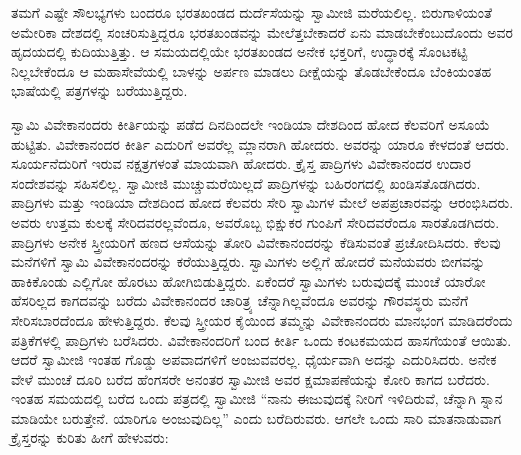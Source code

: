  ತಮಗೆ ಎಷ್ಟೇ ಸೌಲಭ್ಯಗಳು ಬಂದರೂ ಭರತಖಂಡದ ದುರ್ದೆಸೆಯನ್ನು ಸ್ವಾಮೀಜಿ ಮರೆಯಲಿಲ್ಲ. ಬಿರುಗಾಳಿಯಂತೆ ಅಮೇರಿಕಾ ದೇಶದಲ್ಲಿ ಸಂಚರಿಸುತ್ತಿದ್ದರೂ ಭರತಖಂಡವನ್ನು ಮೇಲೆತ್ತಬೇಕಾದರೆ ಏನು ಮಾಡಬೇಕೆಂಬುದೊಂದು ಅವರ ಹೃದಯದಲ್ಲಿ ಕುದಿಯುತ್ತಿತ್ತು. ಆ ಸಮಯದಲ್ಲಿಯೇ ಭರತಖಂಡದ ಅನೇಕ ಭಕ್ತರಿಗೆ, ಉದ್ಧಾರಕ್ಕೆ ಸೊಂಟಕಟ್ಟಿ ನಿಲ್ಲಬೇಕೆಂದೂ ಆ ಮಹಾಸೇವೆಯಲ್ಲಿ ಬಾಳನ್ನು ಅರ್ಪಣ ಮಾಡಲು ದೀಕ್ಷೆಯನ್ನು ತೊಡಬೇಕೆಂದೂ ಬೆಂಕಿಯಂತಹ ಭಾಷೆಯಲ್ಲಿ ಪತ್ರಗಳನ್ನು ಬರೆಯುತ್ತಿದ್ದರು. 

 ಸ್ವಾಮಿ ವಿವೇಕಾನಂದರು ಕೀರ್ತಿಯನ್ನು ಪಡೆದ ದಿನದಿಂದಲೇ ಇಂಡಿಯಾ ದೇಶದಿಂದ ಹೋದ ಕೆಲವರಿಗೆ ಅಸೂಯೆ ಹುಟ್ಟಿತು. ವಿವೇಕಾನಂದರ ಕೀರ್ತಿ ಎದುರಿಗೆ ಅವರೆಲ್ಲ ಮ್ಲಾನರಾಗಿ ಹೋದರು. ಅವರನ್ನು ಯಾರೂ ಕೇಳದಂತೆ ಆದರು. ಸೂರ್ಯನೆದುರಿಗೆ ಇರುವ ನಕ್ಷತ್ರಗಳಂತೆ ಮಾಯವಾಗಿ ಹೋದರು. ಕ್ರೈಸ್ತ ಪಾದ್ರಿಗಳು ವಿವೇಕಾನಂದರ ಉದಾರ ಸಂದೇಶವನ್ನು ಸಹಿಸಲಿಲ್ಲ. ಸ್ವಾಮೀಜಿ ಮುಚ್ಚುಮರೆಯಿಲ್ಲದೆ ಪಾದ್ರಿಗಳನ್ನು ಬಹಿರಂಗದಲ್ಲಿ ಖಂಡಿಸತೊಡಗಿದರು. ಪಾದ್ರಿಗಳು ಮತ್ತು ಇಂಡಿಯಾ ದೇಶದಿಂದ ಹೋದ ಕೆಲವರು ಸೇರಿ ಸ್ವಾಮಿಗಳ ಮೇಲೆ ಅಪಪ್ರಚಾರವನ್ನು ಆರಂಭಿಸಿದರು. ಅವರು ಉತ್ತಮ ಕುಲಕ್ಕೆ ಸೇರಿದವರಲ್ಲವೆಂದೂ, ಅವರೊಬ್ಬ ಭಿಕ್ಷುಕರ ಗುಂಪಿಗೆ ಸೇರಿದವರೆಂದೂ ಸಾರತೊಡಗಿದರು. ಪಾದ್ರಿಗಳು ಅನೇಕ ಸ್ತ್ರೀಯರಿಗೆ ಹಣದ ಆಸೆಯನ್ನು ತೋರಿ ವಿವೇಕಾನಂದರನ್ನು ಕೆಡಿಸುವಂತೆ ಪ್ರಚೋದಿಸಿದರು. ಕೆಲವು ಮನೆಗಳಿಗೆ ಸ್ವಾಮಿ ವಿವೇಕಾನಂದರನ್ನು ಕರೆಯುತ್ತಿದ್ದರು. ಸ್ವಾಮಿಗಳು ಅಲ್ಲಿಗೆ ಹೋದರೆ ಮನೆಯವರು ಬೀಗವನ್ನು ಹಾಕಿಕೊಂಡು ಎಲ್ಲಿಗೋ ಹೊರಟು ಹೋಗಿಬಿಡುತ್ತಿದ್ದರು. ಏಕೆಂದರೆ ಸ್ವಾಮಿಗಳು ಬರುವುದಕ್ಕೆ ಮುಂಚೆ ಯಾರೋ ಹೆಸರಿಲ್ಲದ ಕಾಗದವನ್ನು ಬರೆದು ವಿವೇಕಾನಂದರ ಚಾರಿತ್ರ್ಯ ಚೆನ್ನಾಗಿಲ್ಲವೆಂದೂ ಅವರನ್ನು ಗೌರವಸ್ಥರು ಮನೆಗೆ ಸೇರಿಸಬಾರದೆಂದೂ ಹೇಳುತ್ತಿದ್ದರು. ಕೆಲವು ಸ್ತ್ರೀಯರ ಕೈಯಿಂದ ತಮ್ಮನ್ನು ವಿವೇಕಾನಂದರು ಮಾನಭಂಗ ಮಾಡಿದರೆಂದು ಪತ್ರಿಕೆಗಳಲ್ಲಿ ಪಾದ್ರಿಗಳು ಬರೆಸಿದರು. ವಿವೇಕಾನಂದರಿಗೆ ಬಂದ ಕೀರ್ತಿ ಒಂದು ಕಂಟಕಮಯದ ಹಾಸಗೆಯಂತೆ ಆಯಿತು. ಆದರೆ ಸ್ವಾಮೀಜಿ ಇಂತಹ ಗೊಡ್ಡು ಅಪವಾದಗಳಿಗೆ ಅಂಜುವವರಲ್ಲ. ಧೈರ್ಯವಾಗಿ ಅದನ್ನು ಎದುರಿಸಿದರು. ಅನೇಕ ವೇಳೆ ಮುಂಚೆ ದೂರಿ ಬರೆದ ಹೆಂಗಸರೇ ಅನಂತರ ಸ್ವಾಮೀಜಿ ಅವರ ಕ್ಷಮಾಪಣೆಯನ್ನು ಕೋರಿ ಕಾಗದ ಬರೆದರು. ಇಂತಹ ಸಮಯದಲ್ಲಿ ಬರೆದ ಒಂದು ಪತ್ರದಲ್ಲಿ ಸ್ವಾಮೀಜಿ “ನಾನು ಈಜುವುದಕ್ಕೆ ನೀರಿಗೆ ಇಳಿದಿರುವೆ, ಚೆನ್ನಾಗಿ ಸ್ನಾನ ಮಾಡಿಯೇ ಬರುತ್ತೇನೆ. ಯಾರಿಗೂ ಅಂಜುವುದಿಲ್ಲ” ಎಂದು ಬರೆದಿರುವರು. ಆಗಲೇ ಒಂದು ಸಾರಿ ಮಾತನಾಡುವಾಗ ಕ್ರೈಸ್ತರನ್ನು ಕುರಿತು ಹೀಗೆ ಹೇಳುವರು: 

